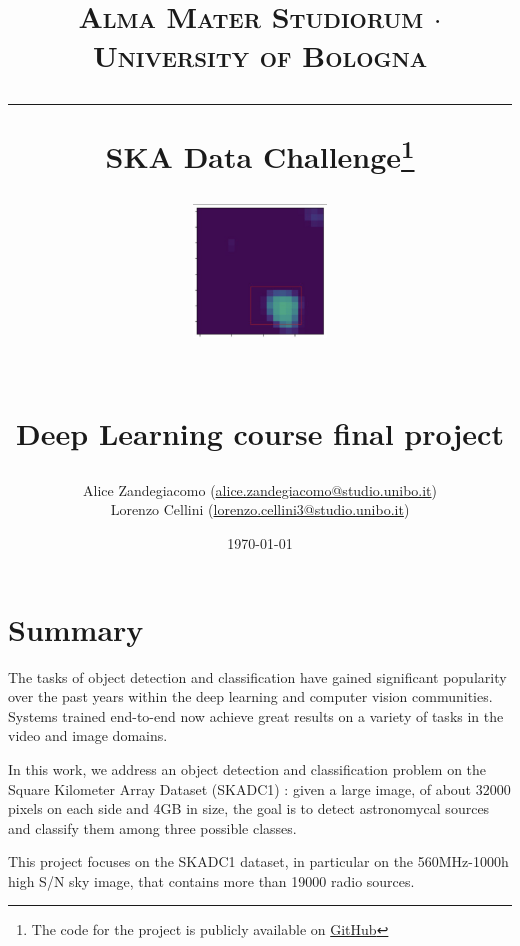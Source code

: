 \documentclass[a4paper,10pt]{report}
\begin{document}
\frenchspacing

\title{
  {{\large{\textsc{Alma Mater Studiorum $\cdot$ University of Bologna}}}}
  \rule{\textwidth}{0.4pt}\vspace{3mm}
  \textbf{SKA Data Challenge\footnote{The code for the project is publicly available on \href{https://github.com/Lorenz92/SKADC1}{GitHub}}}
  \begin{figure}[!htb]
    \centering
    \includegraphics[width = 100pt]{nice-detection}
  \end{figure} \\
  Deep Learning course final project
}

\author{Alice Zandegiacomo (\href{mailto:alice.zandegiacomo@studio.unibo.it}{alice.zandegiacomo@studio.unibo.it}) \\ Lorenzo Cellini (\href{mailto:lorenzo.cellini3@studio.unibo.it}{lorenzo.cellini3@studio.unibo.it})}
\date{\today}
\maketitle
\newpage
\tableofcontents
\setcounter{tocdepth}{1}
\newpage


\chapter{Summary}\label{chap:introduction}

The tasks of object detection and classification have gained significant popularity over the past years within the deep learning and computer vision communities. Systems trained end-to-end now achieve great results on a variety of tasks in the video and image domains.

In this work, we address an object detection and classification problem on the Square Kilometer Array Dataset (SKADC1) \cite{ska-site}: given a large image, of about $32000$ pixels on each side and 4GB in size, the goal is to detect astronomycal sources and classify them among three possible classes.

This project focuses on the SKADC1 dataset, in particular on the 560MHz-1000h high S/N sky image, that contains more than \num{19000} radio sources.
\end{document}
